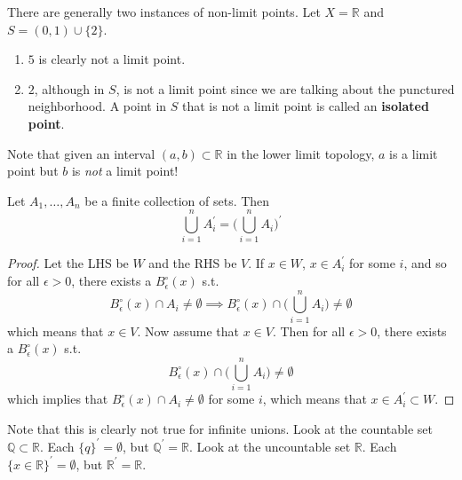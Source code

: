   \begin{example}
    There are generally two instances of non-limit points. Let $X = \mathbb{R}$ and $S = (0, 1) \cup \{2\}$. 
    \begin{enumerate}
      \item $5$ is clearly not a limit point. 
      \item $2$, although in $S$, is not a limit point since we are talking about the punctured neighborhood. A point in $S$ that is not a limit point is called an \textbf{isolated point}. 
    \end{enumerate}
  \end{example}

  \begin{example}
    Note that given an interval $(a, b) \subset \mathbb{R}$ in the lower limit topology, $a$ is a limit point but $b$ is \textit{not} a limit point!
  \end{example}

  \begin{theorem}
    Let $A_1, \ldots, A_n$ be a finite collection of sets. Then 
    \begin{equation}
      \bigcup_{i=1}^n A_i^\prime = \bigg( \bigcup_{i=1}^n A_i \bigg)^\prime
    \end{equation}
  \end{theorem}
  \begin{proof}
    Let the LHS be $W$ and the RHS be $V$. If $x \in W$, $x \in A_i^\prime$ for some $i$, and so for all $\epsilon > 0$, there exists a $B_\epsilon^\circ (x)$ s.t. 
    \begin{equation}
      B_\epsilon^\circ (x) \cap A_i \neq \emptyset \implies B_\epsilon^\circ (x) \cap \bigg( \bigcup_{i=1}^n A_i \bigg) \neq \emptyset
    \end{equation}
    which means that $x \in V$. Now assume that $x \in V$. Then for all $\epsilon > 0$, there exists a $B_\epsilon^\circ (x)$ s.t. 
    \begin{equation}
      B_\epsilon^\circ (x) \cap \bigg( \bigcup_{i=1}^n A_i \bigg) \neq \emptyset
    \end{equation}
    which implies that $B_\epsilon^\circ (x) \cap A_i \neq \emptyset$ for some $i$, which means that $x \in A_i^\prime \subset W$. 
  \end{proof}

  Note that this is clearly not true for infinite unions. Look at the countable set $\mathbb{Q} \subset \mathbb{R}$. Each $\{q\}^\prime = \emptyset$, but $\mathbb{Q}^\prime = \mathbb{R}$. Look at the uncountable set $\mathbb{R}$. Each $\{x \in \mathbb{R}\}^\prime = \emptyset$, but $\mathbb{R}^\prime = \mathbb{R}$. 

